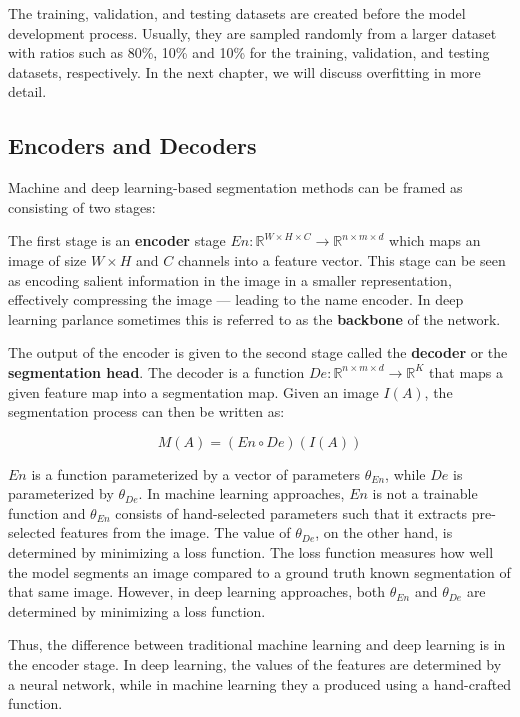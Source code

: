 The training, validation, and testing datasets are created before the model development process. Usually, they are sampled randomly from a larger dataset with ratios such as 80\%, 10\% and 10\% for the training, validation, and testing datasets, respectively. In the next chapter, we will discuss overfitting in more detail.

\subsection{Encoders and Decoders}

Machine and deep learning-based segmentation methods can be framed as consisting of two stages:

The first stage is an \textbf{encoder} stage $En : \mathbb{R}^{W \times H \times C} \rightarrow \mathbb{R}^{n \times m \times d}$ which maps an image of size $W \times H$ and $C$ channels into a feature vector. This stage can be seen as encoding salient information in the image in a smaller representation, effectively compressing the image --- leading to the name encoder. In deep learning parlance sometimes this is referred to as the \textbf{backbone} of the network.

The output of the encoder is given to the second stage called the \textbf{decoder} or the \textbf{segmentation head}. The decoder is a function $De : \mathbb{R}^{n \times m \times d} \rightarrow \mathbb{R}^K$ that maps a given feature map into a segmentation map. Given an image $I(A)$, the segmentation process can then be written as:

\begin{equation}
M(A) = (En \circ De)(I(A))
\end{equation}

$En$ is a function parameterized by a vector of parameters $\theta_{En}$, while $De$ is parameterized by $\theta_{De}$. In machine learning approaches, $En$ is not a trainable function and $\theta_{En}$ consists of hand-selected parameters such that it extracts pre-selected features from the image. The value of $\theta_{De}$, on the other hand, is determined by minimizing a loss function. The loss function measures how well the model segments an image compared to a ground truth known segmentation of that same image. However, in deep learning approaches, both $\theta_{En}$ and $\theta_{De}$ are determined by minimizing a loss function.

Thus, the difference between traditional machine learning and deep learning is in the encoder stage. In deep learning, the values of the features are determined by a neural network, while in machine learning they a produced using a hand-crafted function.

